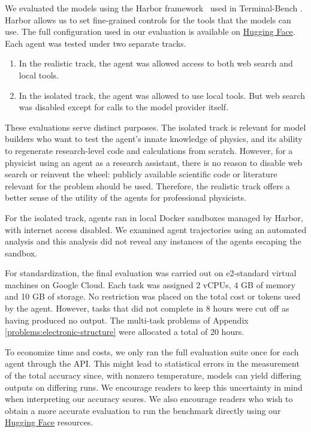 \documentclass[aps,prd,reprint,superscriptaddress,nofootinbib]{revtex4-2}
\newcommand{\benchmarkname}{Hugging Face}
\newcommand{\benchmarkurl}{https://huggingface.co/datasets/RameshChandra1/TheoPhysEval}
\DeclareRobustCommand{\benchmarkrepo}{\href{\benchmarkurl}{\benchmarkname}}
\begin{document}
We evaluated the models using the Harbor framework~\cite{harbor2026framework} used in Terminal-Bench \cite{merrill2026terminal}. Harbor allows us to set fine-grained controls for the tools that the models can use. The full configuration used in our evaluation is available on \benchmarkrepo{}. Each agent was tested under two separate tracks. 
\begin{enumerate}
\item
In the realistic track, the agent was allowed access to both web search and local  tools.
\item
In the isolated track, the agent was allowed to use local tools. But web search was disabled except for calls to the model provider itself.
\end{enumerate}
These evaluations serve distinct purposes. The isolated track is relevant for model builders who want to test the agent's innate knowledge of physics, and its ability to regenerate research-level code and calculations from scratch. However, for a physicist using an agent as a research assistant, there is no reason to disable web search or reinvent the wheel: publicly available scientific code or literature relevant for the problem should be used. Therefore, the realistic track offers a better sense of the utility of the agents for professional physicists.


For the isolated track, agents ran in local Docker sandboxes managed by Harbor, with internet access disabled.
We examined agent trajectories using an automated analysis and this analysis did not reveal any instances of the agents escaping the sandbox.

For standardization, the final evaluation was carried out on e2-standard virtual machines on Google Cloud. Each task was assigned 2 vCPUs,  4 GB of memory and  10 GB of  storage. No restriction was placed on the total cost or tokens used by the agent. However, tasks that did not complete in 8 hours were cut off as having produced no output. The multi-task problems of Appendix \ref{problems:electronic-structure} were allocated a total of 20 hours.

 
To economize time and costs, we only ran the full evaluation suite once for each agent through the API. This might lead to statistical errors in the measurement of the total accuracy since, with nonzero temperature, models can yield differing outputs on differing runs. We encourage readers to keep this uncertainty in mind when interpreting our accuracy scores. We also encourage readers who wish to obtain a more accurate evaluation to run the benchmark directly using our \benchmarkrepo{} resources. 
\end{document}
